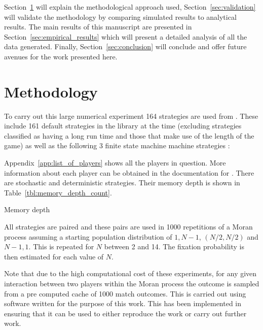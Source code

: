 \documentclass{article}
\begin{document}
Section~\ref{sec:methodology} will explain the methodological approach used,
Section~\ref{sec:validation} will validate the methodology by comparing
simulated results to analytical results. The main results of this manuscript are
presented in Section~\ref{sec:empirical_results} which will present a detailed
analysis of all the data generated. Finally, Section~\ref{sec:conclusion} will
conclude and offer future avenues for the work presented here.

\section{Methodology}\label{sec:methodology}

To carry out this large numerical experiment 164 strategies are used from
\cite{axelrodproject}. These include 161 default strategies in the library at
the time (excluding strategies classified as having a long run time and those
that make use of the length of the game) as well as
the following 3 finite state machine machine strategies \cite{Ashlock2006}:


Appendix~\ref{app:list_of_players} shows all the players in question. More
information about each player can be obtained in the documentation for
\cite{axelrodproject}. There are stochastic and
deterministic strategies. Their memory
depth is shown in Table~\ref{tbl:memory_depth_count}.

\begin{table}[!hbtp]
    \centering
        
        \caption{Memory depth}
        \label{tbl:memory_depth_count}
\end{table}

All strategies are paired and these pairs are used in 1000 repetitions of a
Moran process assuming a starting population distribution of \(1, N-1 \),
\((N/2, N/2)\) and \(N-1 , 1\). This is repeated for \(N\) between 2 and 14. The
fixation probability is then estimated for each value of \(N\).

Note that due to the high computational cost of these experiments, for any given
interaction between two players within the Moran process the outcome is sampled
from a pre computed cache of 1000 match outcomes. This is carried out using
software written for the purpose of this work. This has been
implemented in~\cite{axelrodproject} ensuring that it can be used to either
reproduce the work or carry out further work.
\end{document}
